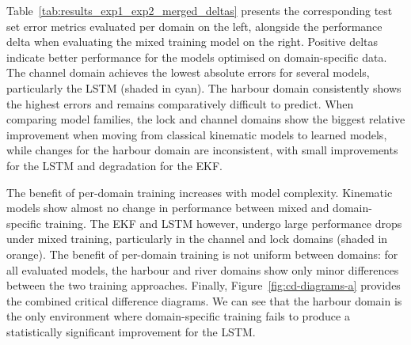 Table~\ref{tab:results_exp1_exp2_merged_deltas} presents the corresponding test set error metrics evaluated per domain on the left, alongside the performance delta when evaluating the mixed training model on the right. Positive deltas indicate better performance for the models optimised on domain-specific data.
The channel domain achieves the lowest absolute errors for several models, particularly the \ac{LSTM} (shaded in cyan).
The harbour domain consistently shows the highest errors and remains comparatively difficult to predict.
When comparing model families, the lock and channel domains show the biggest relative improvement when moving from classical kinematic models to learned models, while changes for the harbour domain are inconsistent, with small improvements for the \ac{LSTM} and degradation for the \ac{EKF}. 

The benefit of per-domain training increases with model complexity. Kinematic models show almost no change in performance between mixed and domain-specific training.
The \ac{EKF} and \ac{LSTM} however, undergo large performance drops under mixed training, particularly in the channel and lock domains (shaded in orange).
The benefit of per-domain training is not uniform between domains: for all evaluated models, the harbour and river domains show only minor differences between the two training approaches. %
Finally, Figure~\ref{fig:cd-diagrams-a} provides the combined critical difference diagrams. We can see that the harbour domain is the only environment where domain-specific training fails to produce a statistically significant improvement for the \ac{LSTM}.

